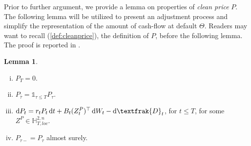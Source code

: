 \documentclass[a4paper, 11pt]{article}              %
\numberwithin{equation}{section}
\theoremstyle{plain}
\newcommand{\btau}{\bar{\tau}}
\newcommand{\1}{\mathds{1}}
\newcommand{\frD}{\textfrak{D}}
\newcommand{\dsH}{\mathbb{H}}
\theoremstyle{plain}
\newtheorem{lemma}[thm]{Lemma}
\theoremstyle{definition}
\newtheorem{lemma}{Lemma}
\theoremstyle{plain}
\newcommand*\df{\mathop{}\!\mathrm{d}}
\begin{document}
Prior to further argument, we provide a lemma on properties of \textit{clean
  price} $P$. The following lemma will be utilized to present an adjustment
process and simplify the representation of the amount of cash-flow at default
$\Theta$. Readers may want to recall (\ref{def:cleanprice}), the definition of
$P$, before the following lemma. The proof is reported in .
\begin{lemma}\label{lem:pf}
\begin{enumerate}[(i)]
\item $P_T = 0$.
\item $P_{\btau} = \1_{\tau \leq T}P_\tau$.
\item   $\df P_t = r_tP_t \df t +B_t(Z^P_t)^{\top}\df W_t - \df
  \frD_t$,  for $t \leq T$,  for some $Z^P \in \dsH^{2, n}_{T,  loc}$. 
\item $P_{\tau-} = P_{\tau}$ almost surely.
\end{enumerate}
\end{lemma}
\end{document}
